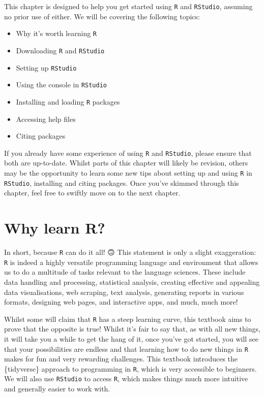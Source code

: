 \documentclass[
  letterpaper,
  DIV=11,
  numbers=noendperiod,
  oneside]{scrreprt}
\providecommand{\tightlist}{%
  \setlength{\itemsep}{0pt}\setlength{\parskip}{0pt}}\usepackage{longtable,booktabs,array}
\begin{document}
This chapter is designed to help you get started using \texttt{R} and
\texttt{RStudio}, assuming no prior use of either. We will be covering
the following topics:

\begin{itemize}
\tightlist
\item
  Why it's worth learning \texttt{R}
\item
  Downloading \texttt{R} and \texttt{RStudio}
\item
  Setting up \texttt{RStudio}
\item
  Using the console in \texttt{RStudio}
\item
  Installing and loading \texttt{R} packages
\item
  Accessing help files
\item
  Citing packages
\end{itemize}

If you already have some experience of using \texttt{R} and
\texttt{RStudio}, please ensure that both are up-to-date. Whilst parts
of this chapter will likely be revision, others may be the opportunity
to learn some new tips about setting up and using \texttt{R} in
\texttt{RStudio}, installing and citing packages. Once you've skimmed
through this chapter, feel free to swiftly move on to the next chapter.

\section{Why learn R?}\label{why-learn-r}

In short, because \texttt{R} can do it all! 🙃 This statement is only a
slight exaggeration: \texttt{R} is indeed a highly versatile programming
language and environment that allows us to do a multitude of tasks
relevant to the language sciences. These include data handling and
processing, statistical analysis, creating effective and appealing data
visualisations, web scraping, text analysis, generating reports in
various formats, designing web pages, and interactive apps, and much,
much more! 💪

Whilst some will claim that \texttt{R} has a steep learning curve, this
textbook aims to prove that the opposite is true! Whilst it's fair to
say that, as with all new things, it will take you a while to get the
hang of it, once you've got started, you will see that your
possibilities are endless and that learning how to do new things in
\texttt{R} makes for fun and very rewarding challenges. This textbook
introduces the \{tidyverse\} approach to programming in \texttt{R},
which is very accessible to beginners. We will also use \texttt{RStudio}
to access \texttt{R}, which makes things much more intuitive and
generally easier to work with.
\end{document}

